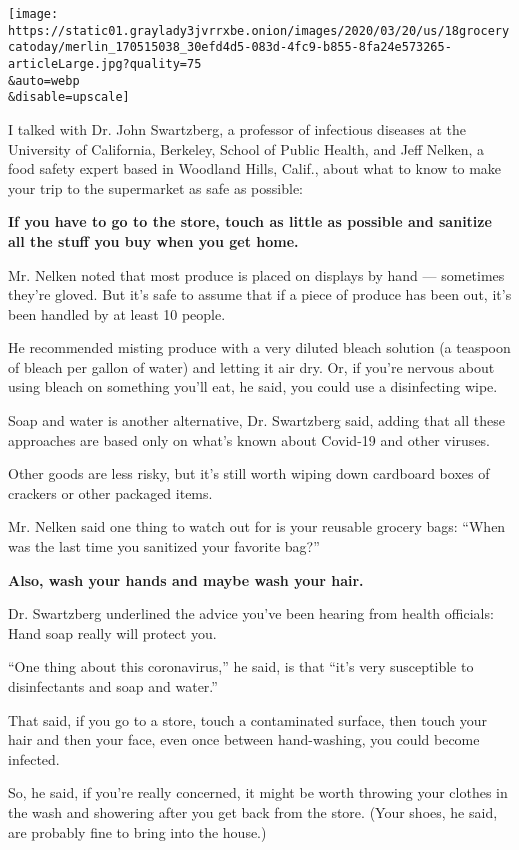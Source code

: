 \texttt{[image: https://static01.graylady3jvrrxbe.onion/images/2020/03/20/us/18grocerycatoday/merlin\_170515038\_30efd4d5-083d-4fc9-b855-8fa24e573265-articleLarge.jpg?quality=75\\\&auto=webp\\\&disable=upscale]}

I talked with Dr. John Swartzberg, a professor of infectious diseases at
the University of California, Berkeley, School of Public Health, and
Jeff Nelken, a food safety expert based in Woodland Hills, Calif., about
what to know to make your trip to the supermarket as safe as possible:

\textbf{If you have to go to the store, touch as little as possible and
sanitize all the stuff you buy when you get home.}

Mr. Nelken noted that most produce is placed on displays by hand ---
sometimes they're gloved. But it's safe to assume that if a piece of
produce has been out, it's been handled by at least 10 people.

He recommended misting produce with a very diluted bleach solution (a
teaspoon of bleach per gallon of water) and letting it air dry. Or, if
you're nervous about using bleach on something you'll eat, he said, you
could use a disinfecting wipe.

Soap and water is another alternative, Dr. Swartzberg said, adding that
all these approaches are based only on what's known about Covid-19 and
other viruses.

Other goods are less risky, but it's still worth wiping down cardboard
boxes of crackers or other packaged items.

Mr. Nelken said one thing to watch out for is your reusable grocery
bags: ``When was the last time you sanitized your favorite bag?''

\textbf{Also, wash your hands and maybe wash your hair.}

Dr. Swartzberg underlined the advice you've been hearing from health
officials: Hand soap really will protect you.

``One thing about this coronavirus,'' he said, is that ``it's very
susceptible to disinfectants and soap and water.''

That said, if you go to a store, touch a contaminated surface, then
touch your hair and then your face, even once between hand-washing, you
could become infected.

So, he said, if you're really concerned, it might be worth throwing your
clothes in the wash and showering after you get back from the store.
(Your shoes, he said, are probably fine to bring into the house.)

